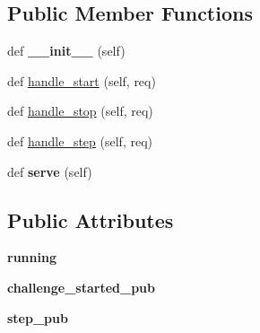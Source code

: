 \subsection*{Public Member Functions}
\begin{DoxyCompactItemize}
\item 
def {\bfseries \+\_\+\+\_\+init\+\_\+\+\_\+} (self)\hypertarget{classthimblerigger__server_1_1ThimbleriggerChallengeServer_a53c52a84120d95ba74380ddb92c94c87}{}\label{classthimblerigger__server_1_1ThimbleriggerChallengeServer_a53c52a84120d95ba74380ddb92c94c87}

\item 
def \hyperlink{classthimblerigger__server_1_1ThimbleriggerChallengeServer_a949229494a1ac9dbff020430e28ab6be}{handle\+\_\+start} (self, req)
\item 
def \hyperlink{classthimblerigger__server_1_1ThimbleriggerChallengeServer_ad69a9dd2ec8e81a3482e553b809c4db8}{handle\+\_\+stop} (self, req)
\item 
def \hyperlink{classthimblerigger__server_1_1ThimbleriggerChallengeServer_a0a96eddd98d2f362bea78861e846b283}{handle\+\_\+step} (self, req)
\item 
def {\bfseries serve} (self)\hypertarget{classthimblerigger__server_1_1ThimbleriggerChallengeServer_af3c6b32e27acaa7252cd5b272e209a9e}{}\label{classthimblerigger__server_1_1ThimbleriggerChallengeServer_af3c6b32e27acaa7252cd5b272e209a9e}

\end{DoxyCompactItemize}
\subsection*{Public Attributes}
\begin{DoxyCompactItemize}
\item 
{\bfseries running}\hypertarget{classthimblerigger__server_1_1ThimbleriggerChallengeServer_a23d3ea1848ec23cd59dacf12e14f14de}{}\label{classthimblerigger__server_1_1ThimbleriggerChallengeServer_a23d3ea1848ec23cd59dacf12e14f14de}

\item 
{\bfseries challenge\+\_\+started\+\_\+pub}\hypertarget{classthimblerigger__server_1_1ThimbleriggerChallengeServer_a3c075847a889773ecc747c1890d9e303}{}\label{classthimblerigger__server_1_1ThimbleriggerChallengeServer_a3c075847a889773ecc747c1890d9e303}

\item 
{\bfseries step\+\_\+pub}\hypertarget{classthimblerigger__server_1_1ThimbleriggerChallengeServer_af86d6f03cb152026d62c8f35914795d3}{}\label{classthimblerigger__server_1_1ThimbleriggerChallengeServer_af86d6f03cb152026d62c8f35914795d3}

\end{DoxyCompactItemize}


